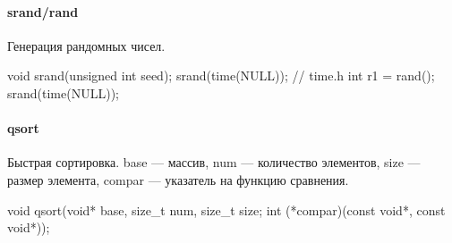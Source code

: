 \paragraph{srand/rand}
Генерация рандомных чисел.
\begin{ccode}
void srand(unsigned int seed);
srand(time(NULL)); // time.h
int r1 = rand();
srand(time(NULL));
\end{ccode}
\paragraph{qsort}
Быстрая сортировка. base --- массив, num --- количество элементов, size --- размер элемента, compar --- указатель на функцию сравнения.
\begin{ccode}
void qsort(void* base, size_t num, size_t size; int (*compar)(const void*, const void*));
\end{ccode}
% 

